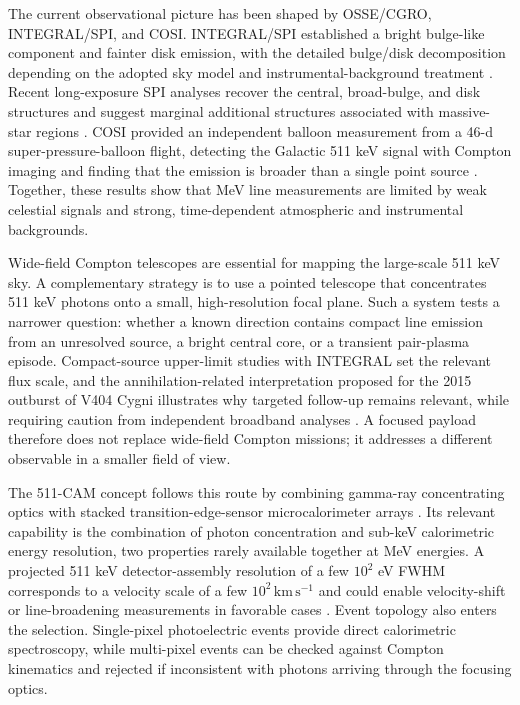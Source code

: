 \documentclass[preprint,12pt]{elsarticle}
\begin{document}
The current observational picture has been shaped by OSSE/CGRO, INTEGRAL/SPI, and COSI. INTEGRAL/SPI established a bright bulge-like component and fainter disk emission, with the detailed bulge/disk decomposition depending on the adopted sky model and instrumental-background treatment \cite{Siegert2016AA,Yoneda2025}. Recent long-exposure SPI analyses recover the central, broad-bulge, and disk structures and suggest marginal additional structures associated with massive-star regions \cite{Yoneda2025}. COSI provided an independent balloon measurement from a 46-d super-pressure-balloon flight, detecting the Galactic 511 keV signal with Compton imaging and finding that the emission is broader than a single point source \cite{Kierans2020,Siegert2020COSI}. Together, these results show that MeV line measurements are limited by weak celestial signals and strong, time-dependent atmospheric and instrumental backgrounds.

Wide-field Compton telescopes are essential for mapping the large-scale 511 keV sky. A complementary strategy is to use a pointed telescope that concentrates 511 keV photons onto a small, high-resolution focal plane. Such a system tests a narrower question: whether a known direction contains compact line emission from an unresolved source, a bright central core, or a transient pair-plasma episode. Compact-source upper-limit studies with INTEGRAL set the relevant flux scale, and the annihilation-related interpretation proposed for the 2015 outburst of V404 Cygni illustrates why targeted follow-up remains relevant, while requiring caution from independent broadband analyses \cite{DeCesare2011,Siegert2016V404,Roques2015}. A focused payload therefore does not replace wide-field Compton missions; it addresses a different observable in a smaller field of view.

The 511-CAM concept follows this route by combining gamma-ray concentrating optics with stacked transition-edge-sensor microcalorimeter arrays \cite{Shirazi2023}. Its relevant capability is the combination of photon concentration and sub-keV calorimetric energy resolution, two properties rarely available together at MeV energies. A projected 511 keV detector-assembly resolution of a few $10^2$ eV FWHM corresponds to a velocity scale of a few $10^2\,\mathrm{km\,s^{-1}}$ and could enable velocity-shift or line-broadening measurements in favorable cases \cite{Shirazi2023}. Event topology also enters the selection. Single-pixel photoelectric events provide direct calorimetric spectroscopy, while multi-pixel events can be checked against Compton kinematics and rejected if inconsistent with photons arriving through the focusing optics.
\end{document}
